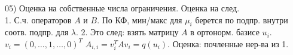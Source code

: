 05) Оценка на собственные числа ограничения. Оценка на след.\\
1. С.ч. операторов $A$ и $B$. По КФ, мин/макс для $\mu_i$ берется по подпр. внутри соотв. подпр. для $\lambda$. 2. Это след: взять матрицу $A$ в ортонорм. базисе $u_i$. $v_i = (0,\dots,1,\dots,0)^T$ $A_{i,i} = v_i^TAv_i = q(u_i)$. Оценка: почленные нер-ва из 1.\\
